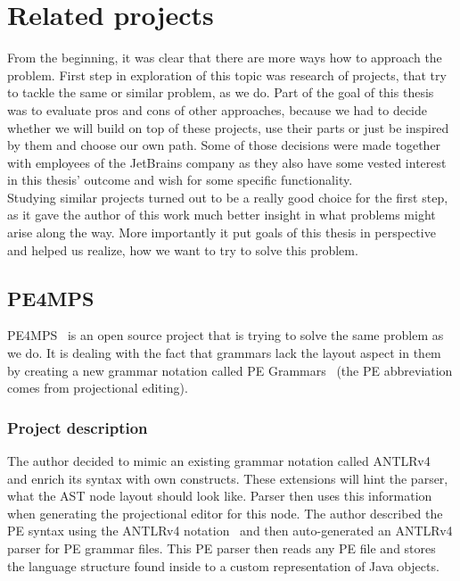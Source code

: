 \chapter{Related projects}

From the beginning, it was clear that there are more ways how to approach the problem. First step in exploration of this topic was research of projects, that try to tackle the same or similar problem, as we do. Part of the goal of this thesis was to evaluate pros and cons of other approaches, because we had to decide whether we will build on top of these projects, use their parts or just be inspired by them and choose our own path. Some of those decisions were made together with employees of the JetBrains company as they also have some vested interest in this thesis' outcome and wish for some specific functionality.
\\

Studying similar projects turned out to be a really good choice for the first step, as it gave the author of this work much better insight in what problems might arise along the way. More importantly it put goals of this thesis in perspective and helped us realize, how we want to try to solve this problem.

\section{PE4MPS}
PE4MPS~\cite{PE4MPS} is an open source project that is trying to solve the same problem as we do. It is dealing with the fact that grammars lack the layout aspect in them by creating a new grammar notation called PE Grammars~\cite{PE} (the PE abbreviation comes from projectional editing).
 
\subsection{Project description}
The author decided to mimic an existing grammar notation called ANTLRv4~\cite{ANTLR4} and enrich its syntax with own constructs. These extensions will hint the parser, what the AST node layout should look like. Parser then uses this information when generating the projectional editor for this node. The author described the PE syntax using the ANTLRv4 notation~\cite{ANTLR4reference} and then auto-generated an ANTLRv4 parser for PE grammar files. This PE parser then reads any PE file and stores the language structure found inside to a custom representation of Java objects.
\\

